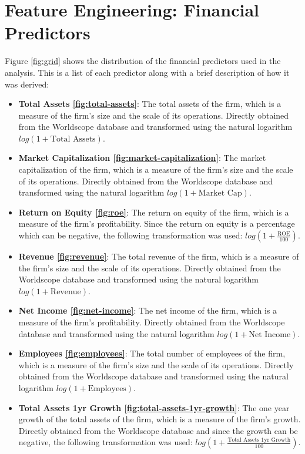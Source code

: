 


\section{Feature Engineering: Financial Predictors}
Figure \ref{fig:grid} shows the distribution of the financial predictors used in the analysis. This is a list of each predictor along with a brief description of how it was derived:
\begin{itemize}
    \item \textbf{Total Assets \ref{fig:total-assets}}: The total assets of the firm, which is a measure of the firm's size and the scale of its operations. Directly obtained from the Worldscope database and transformed using the natural logarithm $log(1 + \text{Total Assets})$.
    \item \textbf{Market Capitalization \ref{fig:market-capitalization}}: The market capitalization of the firm, which is a measure of the firm's size and the scale of its operations. Directly obtained from the Worldscope database and transformed using the natural logarithm $log(1 + \text{Market Cap})$.
    \item \textbf{Return on Equity \ref{fig:roe}}: The return on equity of the firm, which is a measure of the firm's profitability. Since the return on equity is a percentage which can be negative, the following transformation was used: $log(1 + \frac{\text{ROE}}{100})$.
    \item \textbf{Revenue \ref{fig:revenue}}: The total revenue of the firm, which is a measure of the firm's size and the scale of its operations. Directly obtained from the Worldscope database and transformed using the natural logarithm $log(1 + \text{Revenue})$.
    \item \textbf{Net Income \ref{fig:net-income}}: The net income of the firm, which is a measure of the firm's profitability. Directly obtained from the Worldscope database and transformed using the natural logarithm $log(1 + \text{Net Income})$.
    \item \textbf{Employees \ref{fig:employees}}: The total number of employees of the firm, which is a measure of the firm's size and the scale of its operations. Directly obtained from the Worldscope database and transformed using the natural logarithm $log(1 + \text{Employees})$.
    \item \textbf{Total Assets 1yr Growth \ref{fig:total-assets-1yr-growth}}: The one year growth of the total assets of the firm, which is a measure of the firm's growth. Directly obtained from the Worldscope database and since the growth can be negative, the following transformation was used: $log(1 + \frac{\text{Total Assets 1yr Growth}}{100})$.

\end{itemize}
